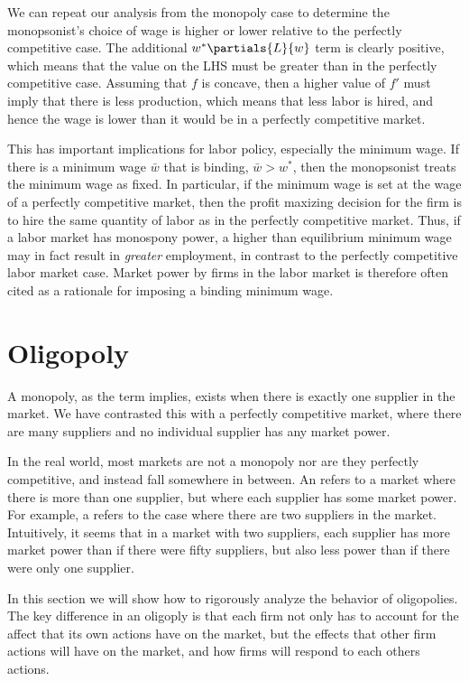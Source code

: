 We can repeat our analysis from the monopoly case to determine the monopsonist's choice of wage is higher or lower relative to the perfectly competitive case. The additional $w^* \partials{L}{w}$ term is clearly positive, which means that the value on the LHS must be greater than in the perfectly competitive case. Assuming that $f$ is concave, then a higher value of $f'$ must imply that there is less production, which means that less labor is hired, and hence the wage is lower than it would be in a perfectly competitive market.

This has important implications for labor policy, especially the minimum wage. If there is a minimum wage $\bar{w}$ that is binding, $\bar{w} > w^*$, then the monopsonist treats the minimum wage as fixed. In particular, if the minimum wage is set at the wage of a perfectly competitive market, then the profit maxizing decision for the firm is to hire the same quantity of labor as in the perfectly competitive market. Thus, if a labor market has monospony power, a higher than equilibrium minimum wage may in fact result in \emph{greater} employment, in contrast to the perfectly competitive labor market case. Market power by firms in the labor market is therefore often cited as a rationale for imposing a binding minimum wage.

\section{Oligopoly}
A monopoly, as the term implies, exists when there is exactly one supplier in the market. We have contrasted this with a perfectly competitive market, where there are many suppliers and no individual supplier has any market power.

In the real world, most markets are not a monopoly nor are they perfectly competitive, and instead fall somewhere in between. An  refers to a market where there is more than one supplier, but where each supplier has some market power. For example, a  refers to the case where there are two suppliers in the market. Intuitively, it seems that in a market with two suppliers, each supplier has more market power than if there were fifty suppliers, but also less power than if there were only one supplier.

In this section we will show how to rigorously analyze the behavior of oligopolies. The key difference in an oligoply is that each firm not only has to account for the affect that its own actions have on the market, but the effects that other firm actions will have on the market, and how firms will respond to each others actions.

